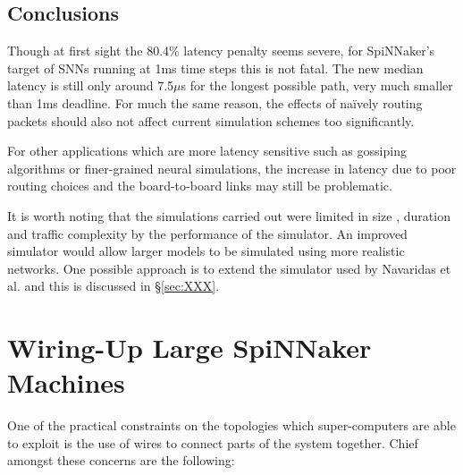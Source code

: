 		\subsection{Conclusions}
			
			Though at first sight the 80.4\% latency penalty seems severe, for
			SpiNNaker's target of SNNs running at 1ms time steps this is not fatal.
			The new median latency is still only around 7.5$\mu$s for the longest
			possible path, very much smaller than 1ms deadline.  For much the same
			reason, the effects of na\"ively routing packets should also not affect
			current simulation schemes too significantly.
			
			
			For other applications which are more latency sensitive such as gossiping
			algorithms or finer-grained neural simulations, the increase in latency
			due to poor routing choices and the board-to-board links may still be
			problematic.
			
			
			It is worth noting that the simulations carried out were limited in size ,
			duration and traffic complexity by the performance of the simulator. An
			improved simulator would allow larger models to be simulated using more
			realistic networks. One possible approach is to extend the simulator used
			by Navaridas et al. and this is discussed in \S\ref{sec:XXX}.
		
	
	\section{Wiring-Up Large SpiNNaker Machines}
		
		\label{sec:wiring-up-large-spinnaker-machines}
		
		
		One of the practical constraints on the topologies which super-computers are
		able to exploit is the use of wires to connect parts of the system together.
		Chief amongst these concerns are the following:
		
